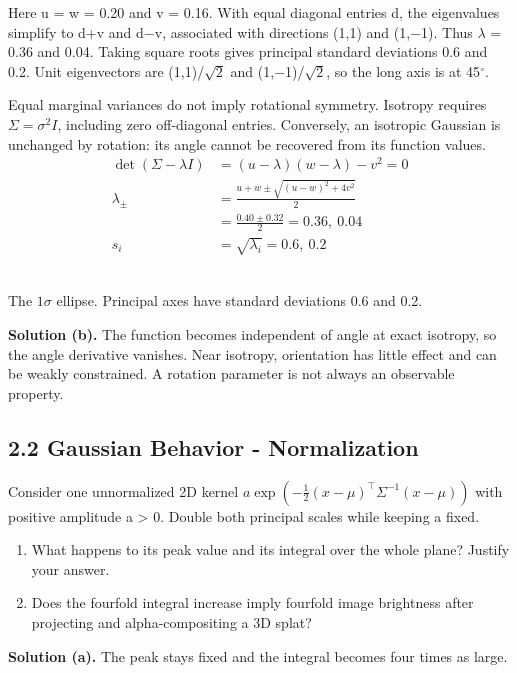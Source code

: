 \documentclass[11pt,a4paper]{article}
\begin{document}
Here u = w = 0.20 and v = 0.16.
With equal diagonal entries d, the eigenvalues simplify to d+v and d$-$v, associated with directions (1,1) and (1,$-$1).
Thus $\lambda$ = 0.36 and 0.04.
Taking square roots gives principal standard deviations 0.6 and 0.2.
Unit eigenvectors are (1,1)/$\sqrt{2}$ and (1,$-$1)/$\sqrt{2}$, so the long axis is at 45${}^\circ$.

Equal marginal variances do not imply rotational symmetry.
Isotropy requires $\Sigma=\sigma^2 I$, including zero off-diagonal entries.
Conversely, an isotropic Gaussian is unchanged by rotation: its angle cannot be recovered from its function values.
\[
\begin{aligned}\det(\Sigma-\lambda I)&=(u-\lambda)(w-\lambda)-v^2=0\\\lambda_\pm&=\frac{u+w\pm\sqrt{(u-w)^2+4v^2}}2\\&=\frac{0.40\pm0.32}2=0.36,\ 0.04\\s_i&=\sqrt{\lambda_i}=0.6,\ 0.2\end{aligned}
\]
\begin{center}
\\
{\small The $1\sigma$ ellipse.
Principal axes have standard deviations 0.6 and 0.2.}
\end{center}
\noindent\textbf{Solution (b).} The function becomes independent of angle at exact isotropy, so the angle derivative vanishes.
Near isotropy, orientation has little effect and can be weakly constrained.
A rotation parameter is not always an observable property.
\subsection*{2.2 Gaussian Behavior - Normalization}
Consider one unnormalized 2D kernel $a\exp(-\frac12(x-\mu)^\top\Sigma^{-1}(x-\mu))$ with positive amplitude a > 0.
Double both principal scales while keeping a fixed.
\begin{enumerate}[label=(\alph*),nosep]
\item What happens to its peak value and its integral over the whole plane?
Justify your answer.
\item Does the fourfold integral increase imply fourfold image brightness after projecting and alpha-compositing a 3D splat?
\end{enumerate}
\noindent\textbf{Solution (a).} The peak stays fixed and the integral becomes four times as large.
\end{document}
